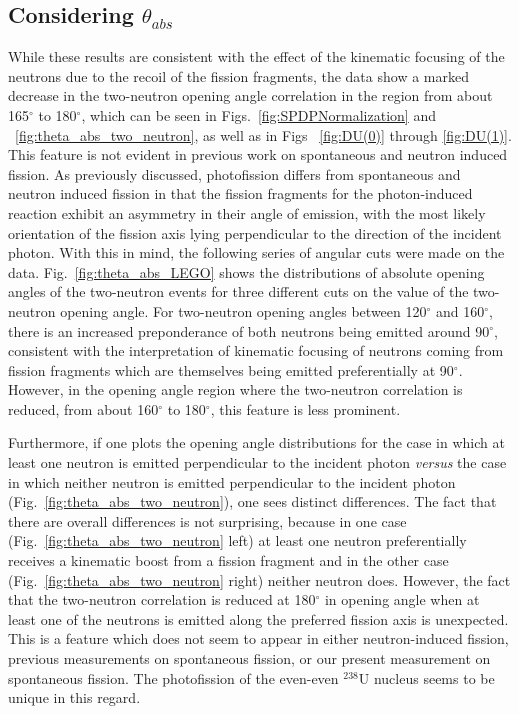 \subsection{Considering $\theta_{abs}$}
While these results are consistent with the effect of the kinematic focusing of the neutrons due to the recoil of the fission fragments, the data show a marked decrease in the two-neutron opening angle correlation in the region from about 165$^{\circ}$ to 180$^{\circ}$, which can be seen in Figs.~\ref{fig:SPDPNormalization} and ~\ref{fig:theta_abs_two_neutron}, as well as in Figs ~\ref{fig:DU(0)} through \ref{fig:DU(1)}.
This feature is not evident in previous work on spontaneous and neutron induced fission.
As previously discussed, photofission differs from spontaneous and neutron induced fission in that the fission fragments for the photon-induced reaction exhibit an asymmetry in their angle of emission, with the most likely orientation of the fission axis lying perpendicular to the direction of the incident photon.
With this in mind, the following series of angular cuts were made on the data.
Fig.~\ref{fig:theta_abs_LEGO} shows the distributions of absolute opening angles of the two-neutron events for three different cuts on the value of the two-neutron opening angle.
For two-neutron opening angles between 120$^{\circ}$ and 160$^{\circ}$, there is an increased preponderance of both neutrons being emitted around 90$^{\circ}$, consistent with the interpretation of kinematic focusing of neutrons coming from fission fragments which are themselves being emitted preferentially at 90$^{\circ}$.
However, in the opening angle region where the two-neutron correlation is reduced, from about 160$^{\circ}$ to 180$^{\circ}$, this feature is less prominent.

Furthermore, if one plots the opening angle distributions for the case in which at least one neutron is emitted perpendicular to the incident photon \emph{versus} the case in which neither neutron is emitted perpendicular to the incident photon (Fig.~\ref{fig:theta_abs_two_neutron}), one sees distinct differences.
The fact that there are overall differences is not surprising, because in one case (Fig.~\ref{fig:theta_abs_two_neutron} left) at least one neutron preferentially receives a kinematic boost from a fission fragment and in the other case (Fig.~\ref{fig:theta_abs_two_neutron} right) neither neutron does.
However, the fact that the two-neutron correlation is reduced at 180$^{\circ}$ in opening angle when at least one of the neutrons is emitted along the preferred fission axis is unexpected.
This is a feature which does not seem to appear in either neutron-induced fission, previous measurements on spontaneous fission, or our present measurement on spontaneous fission.
The photofission of the even-even $^{238}$U nucleus seems to be unique in this regard. 

